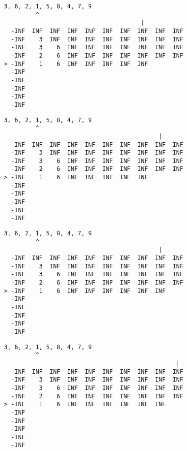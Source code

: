 { \begin{verbatim}
3, 6, 2, 1, 5, 8, 4, 7, 9
         ^
                                       |
  -INF  INF  INF  INF  INF  INF  INF  INF  INF  INF
  -INF    3  INF  INF  INF  INF  INF  INF  INF  INF
  -INF    3    6  INF  INF  INF  INF  INF  INF  INF
  -INF    2    6  INF  INF  INF  INF  INF  INF  INF
> -INF    1    6  INF  INF  INF  INF  INF          
  -INF                                             
  -INF                                             
  -INF                                             
  -INF                                             
  -INF                                             
\end{verbatim} }

{ \begin{verbatim}
3, 6, 2, 1, 5, 8, 4, 7, 9
         ^
                                            |
  -INF  INF  INF  INF  INF  INF  INF  INF  INF  INF
  -INF    3  INF  INF  INF  INF  INF  INF  INF  INF
  -INF    3    6  INF  INF  INF  INF  INF  INF  INF
  -INF    2    6  INF  INF  INF  INF  INF  INF  INF
> -INF    1    6  INF  INF  INF  INF  INF          
  -INF                                             
  -INF                                             
  -INF                                             
  -INF                                             
  -INF                                             
\end{verbatim} }

{ \begin{verbatim}
3, 6, 2, 1, 5, 8, 4, 7, 9
         ^
                                            |
  -INF  INF  INF  INF  INF  INF  INF  INF  INF  INF
  -INF    3  INF  INF  INF  INF  INF  INF  INF  INF
  -INF    3    6  INF  INF  INF  INF  INF  INF  INF
  -INF    2    6  INF  INF  INF  INF  INF  INF  INF
> -INF    1    6  INF  INF  INF  INF  INF  INF     
  -INF                                             
  -INF                                             
  -INF                                             
  -INF                                             
  -INF                                             
\end{verbatim} }

{ \begin{verbatim}
3, 6, 2, 1, 5, 8, 4, 7, 9
         ^
                                                 |
  -INF  INF  INF  INF  INF  INF  INF  INF  INF  INF
  -INF    3  INF  INF  INF  INF  INF  INF  INF  INF
  -INF    3    6  INF  INF  INF  INF  INF  INF  INF
  -INF    2    6  INF  INF  INF  INF  INF  INF  INF
> -INF    1    6  INF  INF  INF  INF  INF  INF     
  -INF                                             
  -INF                                             
  -INF                                             
  -INF                                             
  -INF                                             
\end{verbatim} }

